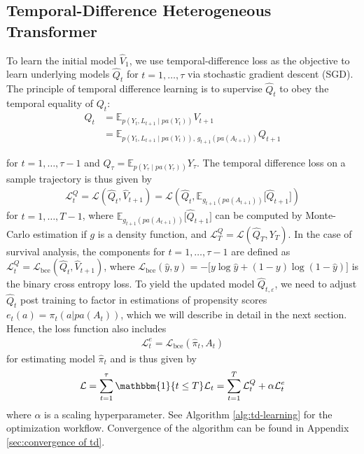 \documentclass{article}
\theoremstyle{plain}
\theoremstyle{definition}
\theoremstyle{remark}
\begin{document}
\subsection{Temporal-Difference Heterogeneous Transformer}

To learn the initial model $\hat{V}_1$, we use temporal-difference loss as the objective to learn underlying models $\hat{Q}_t$ for $t=1, \ldots, \tau$ via stochastic gradient descent (SGD). The principle of temporal difference learning \citep{sutton1988learning, mnih2013playing} is to supervise $\hat{Q}_t$ to obey the temporal equality of $Q_t$:
\begin{align}
    Q_t &= \mathbb E_{p(Y_t, L_{t+1} \mid pa(Y_t))} V_{t+1} \nonumber\\
    &= \mathbb E_{p(Y_t, L_{t+1} \mid pa(Y_t)), \, g_{t+1}(pa(A_{t+1}))} Q_{t+1} 
\end{align}

for $t=1, \ldots, \tau-1$ and $Q_\tau = \mathbb E_{p(Y_\tau \mid pa(Y_\tau))} Y_\tau$. The temporal difference loss on a sample trajectory is thus given by 
\begin{align}
    \mathcal{L}^Q_t = \mathcal{L}(\hat{Q}_t, \hat{V}_{t+1}) = \mathcal{L}(\hat{Q}_t, \mathbb E_{g_{t+1}(pa(A_{t+1}))} \big[\hat{Q}_{t+1}\big])
\end{align}
for $t=1, \ldots, T-1$, where $\mathbb E_{g_{t+1}(pa(A_{t+1}))} \big[\hat{Q}_{t+1}\big]$ can be computed by Monte-Carlo estimation if $g$ is a density function, and $\mathcal{L}^Q_T = \mathcal{L}(\hat{Q}_T, Y_T)$. In the case of survival analysis, the components for $t=1,\ldots,\tau-1$ are defined as
$\mathcal{L}^Q_t = \mathcal{L}_{\mathrm{bce}}(\hat{Q}_t, \hat{V}_{t+1})$, where $\mathcal{L}_{\mathrm{bce}}(\hat{y},y)=-\big[y\log \hat{y}+(1-y)\log(1-\hat{y})\big]$  is the binary cross entropy loss. To yield the updated model $\hat{Q}_{t,\varepsilon}$, we need to adjust $\hat{Q}_t$ post training to factor in estimations of propensity scores $e_t(a) = \pi_t(a | pa(A_t))$, which we will describe in detail in the next section. Hence, the loss function also includes 
\begin{align}
    \mathcal{L}^e_t = \mathcal{L}_{\mathrm{bce}}(\hat{\pi}_t, A_t)
\end{align}
for estimating model $\hat{\pi}_t$ and is thus given by
\begin{align}
    \mathcal{L} 
    = \sum_{t=1}^{\tau} \mathbbm{1}\{t \leq T\} \mathcal{L}_t 
    = \sum_{t=1}^{T} \mathcal{L}^{Q}_t + \alpha \mathcal{L}^e_t
\end{align} 
where $\alpha$ is a scaling hyperparameter. See Algorithm \ref{alg:td-learning} for the optimization workflow. Convergence of the algorithm can be found in Appendix \ref{sec:convergence of td}.
\end{document}
